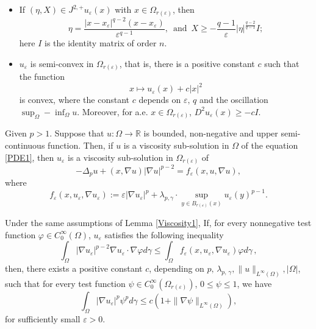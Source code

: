 \documentclass[10pt,a4paper]{amsart}
\newcommand{\R}{\mathbb R}
\begin{document}
\begin{proposition}
\begin{itemize}
  \item If $(\eta,X)\in J^{2,+} u_\varepsilon(x)$ with $x\in \Omega_{r(\varepsilon)}$, then
  \[
  \eta=\frac{|x-x_\varepsilon|^{q-2}(x-x_\varepsilon)}{\varepsilon^{q-1}},\ \mathop{and}\ X \geq - \frac{q-1}{\varepsilon}|\eta|^{\frac{q-2}{q-1}} I;
  \]
 here $I$ is the identity matrix of order $n$.
  \item $u_\varepsilon $ is semi-convex in $\Omega_{r(\varepsilon)}$, that is, there is a positive constant $c$ such that the function
  \[
  x\mapsto u_\varepsilon (x)+c|x|^2
  \]
  is convex, where the constant $c$ depends on $\varepsilon,\,q$ and the oscillation $\sup_{\Omega}-\inf_{\Omega} u$. Moreover, for a.e. $x\in \Omega_{r(\varepsilon)}$, $D^2 u_\varepsilon(x) \geq -cI$.
\end{itemize}
\end{proposition}

\begin{lemma}\label{Viscosity1}
Given $p>1$. Suppose that $u:\Omega \rightarrow \R$ is bounded, non-negative and upper semi-continuous function. Then, if $u$ is a viscosity sub-solution in $\Omega$ of the equation \eqref{PDE1}, then $u_\varepsilon$ is a viscosity sub-solution in $ \Omega_{r(\varepsilon)}$ of
\begin{equation}\label{viscosity-super-solution}
 -\Delta_p u +(x,\nabla u)|\nabla u|^{p-2}= f_\varepsilon(x,u,\nabla u),
\end{equation}
where
\begin{equation}\label{3-1}
f_\varepsilon(x,u_\varepsilon,\nabla u_\varepsilon):=\varepsilon |\nabla u_\varepsilon|^{p}+\lambda_{p,\gamma}\cdot{\sup}_{y\in B_{r(\varepsilon)}(x)} u_\varepsilon(y)^{p-1}.
\end{equation}
\end{lemma}

\begin{lemma}\label{Caccioppoli}
Under the same assumptions of Lemma \ref{Viscosity1}, {   If, for every nonnegative test function $\varphi\in C^{\infty}_0(\Omega)$, $u_\varepsilon$ satisfies the following inequality
\begin{equation}\label{newassumption}
\int_{\Omega}|\nabla u_\varepsilon|^{p-2}\nabla u_\varepsilon\cdot \nabla \varphi d\gamma \leq \int_\Omega  f_\varepsilon(x,u_\varepsilon,\nabla u_\varepsilon)\varphi d\gamma \,,
\end{equation}}
then, there exists a positive constant $c$, depending on $p,\,\lambda_{p,\,\gamma},\|u\|_{L^{\infty}(\Omega)},|\Omega|$,  such that for every test function $\psi\in C^{\infty}_0(\Omega_{r(\varepsilon)})$, $ 0\leq \psi \leq 1$, we have
\begin{equation}\label{Caccioppoli ineq}
\int_{\Omega} |\nabla u_\varepsilon|^p \psi^p d\gamma \leq c(1+\|\nabla \psi\|_{L^{\infty}(\Omega)}),
\end{equation}
for sufficiently small $\varepsilon>0$.
\end{lemma}
\end{document}

